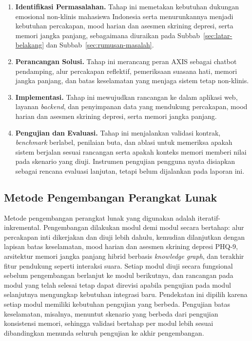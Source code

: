 \begin{enumerate}[label=\arabic*.,leftmargin=*,itemsep=4pt]
  \item \textbf{Identifikasi Permasalahan.} Tahap ini memetakan kebutuhan dukungan emosional non-klinis mahasiswa Indonesia serta menurunkannya menjadi kebutuhan percakapan, mood harian dan asesmen skrining depresi, serta memori jangka panjang, sebagaimana diuraikan pada Subbab~\ref{sec:latar-belakang} dan Subbab~\ref{sec:rumusan-masalah}.

  \item \textbf{Perancangan Solusi.} Tahap ini merancang peran AXIS sebagai chatbot pendamping, alur percakapan reflektif, pemeriksaan suasana hati, memori jangka panjang, dan batas keselamatan yang menjaga sistem tetap non-klinis.

  \item \textbf{Implementasi.} Tahap ini mewujudkan rancangan ke dalam aplikasi web, layanan \textit{backend}, dan penyimpanan data yang mendukung percakapan, mood harian dan asesmen skrining depresi, serta memori jangka panjang.

  \item \textbf{Pengujian dan Evaluasi.} Tahap ini menjalankan validasi kontrak, \textit{benchmark} berlabel, penilaian buta, dan ablasi untuk memeriksa apakah sistem berjalan sesuai rancangan serta apakah konteks memori memberi nilai pada skenario yang diuji. Instrumen pengujian pengguna nyata disiapkan sebagai rencana evaluasi lanjutan, tetapi belum dijalankan pada laporan ini.
\end{enumerate}

\subsection{Metode Pengembangan Perangkat Lunak}
\label{subsec:metode-pengembangan-perangkat-lunak}

Metode pengembangan perangkat lunak yang digunakan adalah iteratif-inkremental. Pengembangan dilakukan modul demi modul secara bertahap: alur percakapan inti dikerjakan dan diuji lebih dahulu, kemudian dilanjutkan dengan lapisan batas keselamatan, mood harian dan asesmen skrining depresi PHQ-9, arsitektur memori jangka panjang hibrid berbasis \textit{knowledge graph}, dan terakhir fitur pendukung seperti interaksi suara. Setiap modul diuji secara fungsional sebelum pengembangan berlanjut ke modul berikutnya, dan rancangan pada modul yang telah selesai tetap dapat direvisi apabila pengujian pada modul selanjutnya mengungkap kebutuhan integrasi baru. Pendekatan ini dipilih karena setiap modul memiliki kebutuhan pengujian yang berbeda. Pengujian batas keselamatan, misalnya, menuntut skenario yang berbeda dari pengujian konsistensi memori, sehingga validasi bertahap per modul lebih sesuai dibandingkan menunda seluruh pengujian ke akhir pengembangan.

